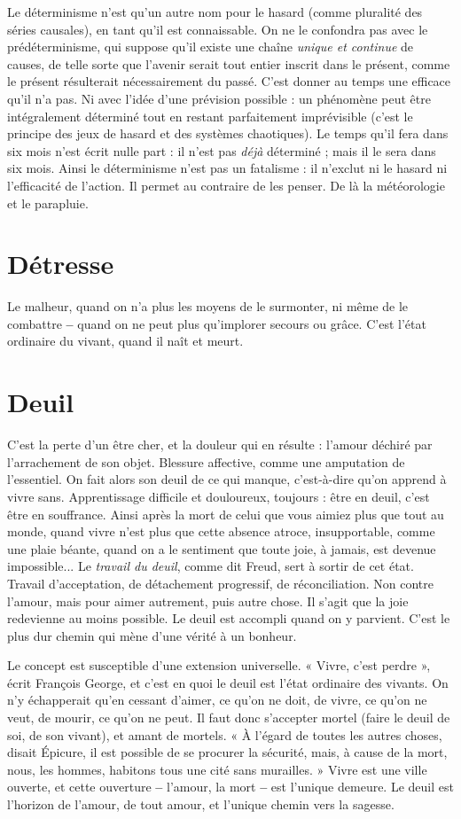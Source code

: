Le déterminisme n’est qu’un autre nom pour le hasard (comme pluralité
des séries causales), en tant qu’il est connaissable. On ne le confondra pas avec
le prédéterminisme, qui suppose qu’il existe une chaîne {\it unique et continue} de
causes, de telle sorte que l'avenir serait tout entier inscrit dans le présent,
comme le présent résulterait nécessairement du passé. C’est donner au temps
une efficace qu’il n’a pas. Ni avec l’idée d’une prévision possible : un phénomène
peut être intégralement déterminé tout en restant parfaitement imprévisible
(c’est le principe des jeux de hasard et des systèmes chaotiques). Le temps
qu'il fera dans six mois n’est écrit nulle part : il n’est pas {\it déjà} déterminé ; mais
il le sera dans six mois. Ainsi le déterminisme n’est pas un fatalisme : il n’exclut
ni le hasard ni l'efficacité de l’action. Il permet au contraire de les penser. De là
la météorologie et le parapluie.

\section{Détresse}
Le malheur, quand on n’a plus les moyens de le surmonter, ni
même de le combattre {\bf --} quand on ne peut plus qu’implorer
secours ou grâce. C’est l’état ordinaire du vivant, quand il naît et meurt.

\section{Deuil}
C'est la perte d’un être cher, et la douleur qui en résulte : l'amour
déchiré par l’arrachement de son objet. Blessure affective, comme
une amputation de l'essentiel. On fait alors son deuil de ce qui manque, c’est-à-dire
qu’on apprend à vivre sans. Apprentissage difficile et douloureux, toujours :
être en deuil, c’est être en souffrance. Ainsi après la mort de celui que vous aimiez
plus que tout au monde, quand vivre n’est plus que cette absence atroce, insupportable,
comme une plaie béante, quand on a le sentiment que toute joie, à
jamais, est devenue impossible... Le {\it travail du deuil}, comme dit Freud, sert à
sortir de cet état. Travail d’acceptation, de détachement progressif, de réconciliation.
Non contre l'amour, mais pour aimer autrement, puis autre chose. Il s’agit
que la joie redevienne au moins possible. Le deuil est accompli quand on y parvient.
C’est le plus dur chemin qui mène d’une vérité à un bonheur.

Le concept est susceptible d’une extension universelle. « Vivre, c’est
perdre », écrit François George, et c’est en quoi le deuil est l’état ordinaire des
vivants. On n’y échapperait qu’en cessant d’aimer, ce qu’on ne doit, de vivre,
ce qu'on ne veut, de mourir, ce qu’on ne peut. Il faut donc s’accepter mortel
(faire le deuil de soi, de son vivant), et amant de mortels. « À l'égard de toutes
les autres choses, disait Épicure, il est possible de se procurer la sécurité, mais,
à cause de la mort, nous, les hommes, habitons tous une cité sans murailles. »
Vivre est une ville ouverte, et cette ouverture {\bf --} l’amour, la mort {\bf --} est l’unique
demeure. Le deuil est l'horizon de l'amour, de tout amour, et l'unique chemin
vers la sagesse.

